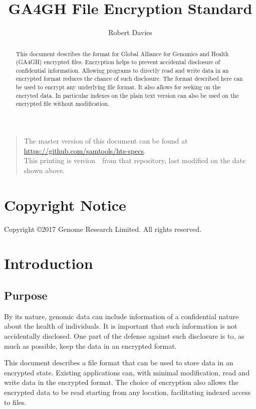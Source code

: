 \documentclass[10pt]{article}
\begin{document}

\title{GA4GH File Encryption Standard}
\author{Robert Davies}
\date{\headdate}
\maketitle
\begin{quote}\small
The master version of this document can be found at
\url{https://github.com/samtools/hts-specs}.\\
This printing is version~\commitdesc\ from that repository,
last modified on the date shown above.
\end{quote}
\vspace*{1em}

\begin{abstract}
This document describes the format for Global Alliance for Genomics and Health (GA4GH) encrypted files.
Encryption helps to prevent accidental disclosure of confidential information.
Allowing programs to directly read and write data in an encrypted format reduces the chance of such disclosure.
The format described here can be used to encrypt any underlying file format.
It also allows for seeking on the encryted data.
In particular indexes on the plain text version can also be used on the encrypted file without modification.
\end{abstract}
\newpage
\section*{Copyright Notice}
Copyright \copyright 2017 Genome Research Limited.  All rights reserved.

\tableofcontents
\newpage
\section{Introduction}
\subsection{Purpose}
By its nature, genomic data can include information of a confidential nature about the health of individuals.
It is important that such information is not accidentally disclosed.
One part of the defense against such disclosure is to, as much as possible, keep the data in an encrypted format.

This document describes a file format that can be used to store data in an encrypted state.
Existing applications can, with minimal modification, read and write data in the encrypted format.
The choice of encryption also allows the encrypted data to be read starting from any location, facilitating indexed
access to files.
\end{document}
